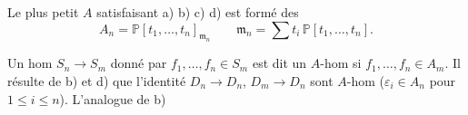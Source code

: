 Le plus petit $A$ satisfaisant a) b) c) d) est formé des
\[
 A_n=\mathbb P[t_1,\ldots,t_n]_{\mathfrak m_n}\qquad
 \mathfrak m_n=\sum t_i\,\mathbb P[t_1,\ldots,t_n].
\]

 Un hom $S_n\longrightarrow S_m$  donné par $f_1,\ldots,f_n\in S_m$ est dit un $A$-hom si $f_1,\ldots,f_n\in A_m$. Il résulte de b) et d) que l'identité $D_n\to D_n$,  $D_m\to D_n$ sont  $A$-hom ($\varepsilon_i\in A_n$ pour $1\leq i\leq n$). L'analogue de b)
